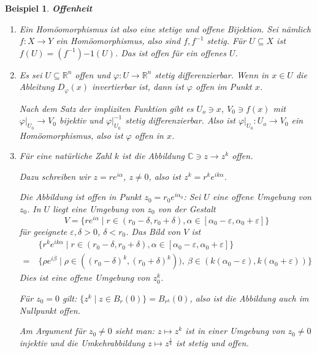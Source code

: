 \documentclass[12pt]{scrbook}   %
\newtheorem{bspX}[alles]{Beispiel}
\newenvironment{bsp}[1]{\begin{bspX}{\bf #1}\par\rm}{\end{bspX}}
\begin{document}
\begin{bsp}{Offenheit}
\label{kte Wurzel}
\begin{enumerate}
\item 
Ein Homöomorphismus ist also eine stetige und offene Bijektion.
Sei nämlich $f:X\to Y$ ein Homöomorphismus, also sind $f, f^{-1}$ stetig. Für $U\subseteq X$ ist $f(U) = (f^{-1}){-1}(U)$. Das ist offen für ein offenes $U$.

\item Es sei $U\subseteq \mathbb R^n$ offen und $\varphi : U \to \mathbb R^n$ stetig differenzierbar. Wenn in $x\in U$ die Ableitung $D_{\varphi}(x)$ invertierbar ist, dann ist $\varphi$ offen im Punkt $x$.

Nach dem Satz der impliziten Funktion gibt es $U_o\ni x$, $V_0\ni f(x)$ mit $\varphi|_{U_0} \to V_0$ bijektiv und $\varphi|_{U_0}^{-1}$ stetig differenzierbar. Also ist $\varphi|_{U_0}:U_o\to V_0$ ein Homöomorphismus, also ist $\varphi$ offen in $x$.

\item Für eine natürliche Zahl $k$ ist die Abbildung $\mathbb C\ni z \to z^k$ offen.

Dazu schreiben wir $z=r e^{i\alpha}$, $z\ne 0$, also ist $z^k = r^k e^{ik\alpha}$.

Die Abbildung ist offen in Punkt $z_0 = r_0e^{i\alpha_0}$: Sei $U$ eine offene Umgebung von $z_0$. In $U$ liegt eine Umgebung von $z_0$ von der Gestalt 
\[V=\{re^{i\alpha} \mid r\in (r_0-\delta,r_0+\delta), \alpha\in[\alpha_0-\varepsilon,\alpha_0+\varepsilon]\} \]
für geeignete $\varepsilon,\delta>0$, $\delta < r_0$. Das Bild von $V$ ist
\begin{align*}
&\{r^ke^{ik\alpha} \mid r\in (r_0-\delta,r_0+\delta), \alpha\in[\alpha_0-\varepsilon,\alpha_0+\varepsilon]\} \\
=\ &\{\rho e^{i\beta} \mid \rho\in((r_0-\delta)^k,(r_0+\delta)^k)),\ \beta \in (k(\alpha_0-\varepsilon), k(\alpha_0+\varepsilon))\} 
\end{align*}
Dies ist eine offene Umgebung von $z_0^k$.

Für $z_0=0$ gilt: $\{z^k\mid z\in B_r(0)\} = B_{r^k}(0)$, also ist die Abbildung auch im Nullpunkt offen.

Am Argument für $z_0\ne 0$ sieht man: $z\mapsto z^k$ ist in einer Umgebung von $z_0\ne 0$ injektiv und die Umkehrabbildung $z\mapsto z^{\frac 1k}$ ist stetig und offen.
\end{enumerate}
\end{bsp}
\end{document}
